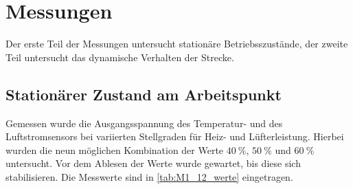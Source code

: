 \section{Messungen}

Der erste Teil der Messungen untersucht stationäre Betriebsszustände, der zweite Teil untersucht das dynamische Verhalten der Strecke.

\subsection{Stationärer Zustand am Arbeitspunkt}


Gemessen wurde die Ausgangsspannung des Temperatur- und des Luftstromsensors bei variierten Stellgraden für Heiz- und Lüfterleistung. Hierbei wurden die neun möglichen Kombination der Werte \(\SI{40}{\percent}\), \( \SI{50}{\percent}\) und \(\SI{60}{\percent}\) untersucht. Vor dem Ablesen der Werte wurde gewartet, bis diese sich stabilisieren. Die Messwerte sind in \autoref{tab:M1_12_werte} eingetragen.

